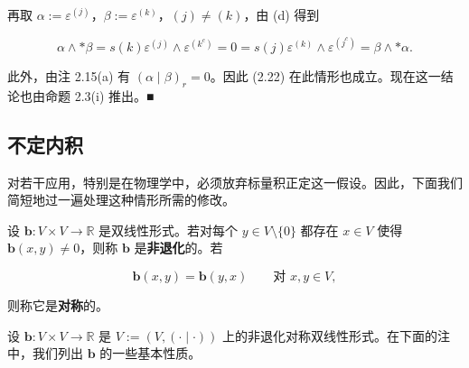 \begin{example}
\begin{items}
再取 $ \alpha := \varepsilon^{(j)} $，$ \beta := \varepsilon^{(k)} $，$ (j) \ne (k) $，由 (d) 得到

\[
\alpha \wedge \ast\beta = s(k)\varepsilon^{(j)} \wedge \varepsilon^{(k^{c})} = 0 = s(j)\varepsilon^{(k)} \wedge \varepsilon^{(j^{c})} = \beta \wedge \ast\alpha.
\]

此外，由注 2.15(a) 有 $ (\alpha \mid \beta)_r = 0 $。因此 (2.22) 在此情形也成立。现在这一结论也由命题 2.3(i) 推出。\nobreak\hspace{0.35em}■

\end{items}

\end{example}

\subsection*{不定内积}

对若干应用，特别是在物理学中，必须放弃标量积正定这一假设。因此，下面我们简短地过一遍处理这种情形所需的修改。

设 $ \mathbf{b}: V \times V \to \mathbb{R} $ 是双线性形式。若对每个 $ y \in V \setminus \{0\} $ 都存在 $ x \in V $ 使得 $ \mathbf{b}(x,y) \neq 0 $，则称 $ \mathbf{b} $ 是\textbf{非退化}的。若

\[
\mathbf{b}(x,y) = \mathbf{b}(y,x) \qquad \text{对 } x, y \in V,
\]

则称它是\textbf{对称}的。

设 $ \mathbf{b}: V \times V \to \mathbb{R} $ 是 $ V := (V, (\cdot \mid \cdot)) $ 上的非退化对称双线性形式。在下面的注中，我们列出 $ \mathbf{b} $ 的一些基本性质。

